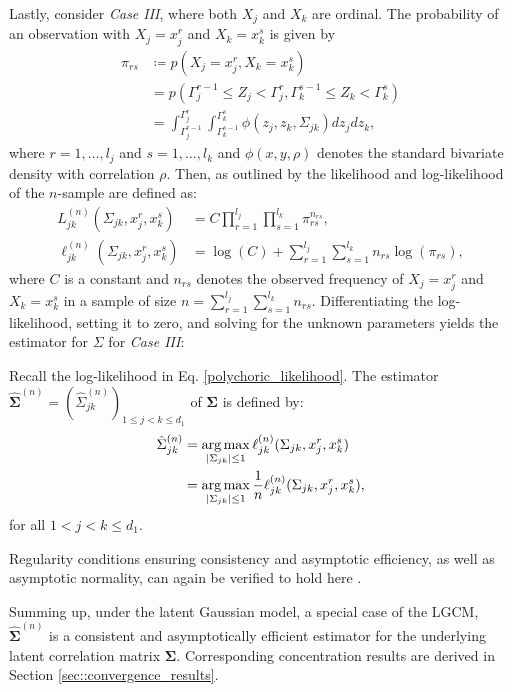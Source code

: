 Lastly, consider \textit{Case III}, where both $X_j$ and $X_k$ are ordinal. The probability of an observation with $X_j = x^r_j$ and $X_k = x^s_k$ is given by
\begin{equation}\label{cell_probabilities}
    \begin{split}
        \pi_{rs} &\coloneqq p(X_j = x^r_j, X_k = x^s_k) \\
        &= p(\Gamma_j^{r-1} \leq Z_j < \Gamma_j^r, \Gamma_k^{s-1} \leq Z_k < \Gamma_k^s) \\
        &= \int_{\Gamma_j^{r-1}}^{\Gamma_j^{r}} \int_{\Gamma_k^{s-1}}^{\Gamma_k^{s}} \phi(z_j,z_k,\Sigma_{jk}) dz_j dz_k,
    \end{split}
\end{equation}
where $r = 1, \dots, l_j$ and $s = 1, \dots, l_k$ and $\phi(x,y,\rho)$ denotes the standard bivariate density with correlation $\rho$. Then, as outlined by \citet{Olsson79} the likelihood and log-likelihood of the $n$-sample are defined as:
\begin{equation}\label{polychoric_likelihood}
    \begin{split}
        L_{jk}^{(n)}(\Sigma_{jk}, x_j^r,x_k^s) &= C \prod_{r=1}^{l_{{j}}} \prod_{s=1}^{l_{{k}}} \pi_{rs}^{n_{rs}}, \\
        \ell_{jk}^{(n)}(\Sigma_{jk}, x_j^r,x_k^s) &= \log(C) + \sum_{r=1}^{l_{{j}}}\sum_{s=1}^{l_{k}} n_{rs} \log(\pi_{rs}),
    \end{split}
\end{equation}
where $C$ is a constant and $n_{rs}$ denotes the observed frequency of $X_j = x^r_j$ and $X_k = x^s_k$ in a sample of size $n= \sum_{r=1}^{l_{{j}}}\sum_{s=1}^{l_{{k}}} n_{rs}$. Differentiating the log-likelihood, setting it to zero, and solving for the unknown parameters yields the estimator for $\Sigma$ for \textit{Case III}:
\begin{definition}\label{definition_case3}
    Recall the log-likelihood in Eq. \eqref{polychoric_likelihood}. The estimator $\hat{\mathbf{\Sigma}}^{(n)} = (\hat{\Sigma}_{jk}^{(n)})_{1\leq j < k\leq d_1}$ of $\mathbf{\Sigma}$ is defined by:
    \begin{equation}
        \begin{split}
            \hat{\Sigma}_{jk}^{(n)} &= \argmax_{\Abs{\Sigma_{jk}} \leq 1} \ell_{jk}^{(n)}(\Sigma_{jk}, x_j^r,x_k^s) \\
            &= \argmax_{\Abs{\Sigma_{jk}} \leq 1} \frac{1}{n} \ell_{jk}^{(n)}(\Sigma_{jk}, x_j^r,x_k^s),
        \end{split}
    \end{equation}
    for all $1 < j < k \leq d_1 $.
\end{definition}
\noindent Regularity conditions ensuring consistency and asymptotic efficiency, as well as asymptotic normality, can again be verified to hold here \citep{Wallentin17}.

Summing up, under the latent Gaussian model, a special case of the LGCM, $\hat{\mathbf{\Sigma}}^{(n)}$ is a consistent and asymptotically efficient estimator for the underlying latent correlation matrix $\mathbf{\Sigma}$. Corresponding concentration results are derived in Section \ref{sec::convergence_results}.